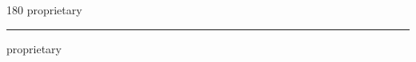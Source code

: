 
\begin{frame}
\begin{center}
\begin{turn}{180}
{\fontsize{2.5cm}{1em}\selectfont proprietary}
\end{turn}
\vspace{1em}\par  
\hrule
\vspace{1em}\par  
{\fontsize{2.5cm}{1em}\selectfont proprietary}
\end{center}
\end{frame}
